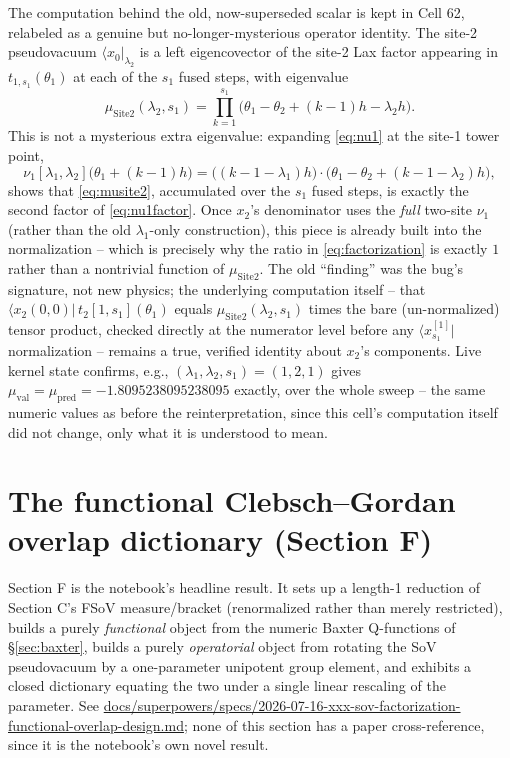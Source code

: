 \documentclass[11pt]{article}
\begin{document}
The computation behind the old, now-superseded scalar is kept in Cell 62, relabeled as a genuine
but no-longer-mysterious operator identity. The site-2 pseudovacuum $\langle x_0|_{\lambda_2}$ is a
left eigencovector of the site-2 Lax factor appearing in $t_{1,s_1}(\theta_1)$ at each of the $s_1$
fused steps, with eigenvalue
\begin{equation}
  \mu_{\mathrm{Site2}}(\lambda_2,s_1) = \prod_{k=1}^{s_1}\bigl(\theta_1-\theta_2+(k-1)h-\lambda_2 h\bigr).
  \label{eq:musite2}
\end{equation}
This is not a mysterious extra eigenvalue: expanding \eqref{eq:nu1} at the site-1 tower point,
\begin{equation}
  \nu_1[\lambda_1,\lambda_2]\bigl(\theta_1+(k-1)h\bigr) = \bigl((k-1-\lambda_1)h\bigr)\cdot
  \bigl(\theta_1-\theta_2+(k-1-\lambda_2)h\bigr),
  \label{eq:nu1factor}
\end{equation}
shows that \eqref{eq:musite2}, accumulated over the $s_1$ fused steps, is exactly the second factor
of \eqref{eq:nu1factor}. Once $x_2$'s denominator uses the \emph{full} two-site $\nu_1$ (rather than
the old $\lambda_1$-only construction), this piece is already built into the normalization -- which
is precisely why the ratio in \eqref{eq:factorization} is exactly $1$ rather than a nontrivial
function of $\mu_{\mathrm{Site2}}$. The old ``finding'' was the bug's signature, not new physics;
the underlying computation itself -- that $\langle x_2(0,0)|\,t_2[1,s_1](\theta_1)$ equals
$\mu_{\mathrm{Site2}}(\lambda_2,s_1)$ times the bare (un-normalized) tensor product, checked directly
at the numerator level before any $\langle x^{[1]}_{s_1}|$ normalization -- remains a true, verified
identity about $x_2$'s components. Live kernel state confirms, e.g.,
$(\lambda_1,\lambda_2,s_1)=(1,2,1)$ gives $\mu_{\mathrm{val}}=\mu_{\mathrm{pred}}=-1.8095238095238095$
exactly, over the whole sweep -- the same numeric values as before the reinterpretation, since this
cell's computation itself did not change, only what it is understood to mean.

\section{The functional Clebsch--Gordan overlap dictionary (Section F)}
\label{sec:dictionary}

Section F is the notebook's headline result. It sets up a length-1 reduction of Section C's FSoV
measure/bracket (renormalized rather than merely restricted), builds a purely \emph{functional}
object from the numeric Baxter Q-functions of \S\ref{sec:baxter}, builds a purely
\emph{operatorial} object from rotating the SoV pseudovacuum by a one-parameter unipotent group
element, and exhibits a closed dictionary equating the two under a single linear rescaling of the
parameter. See
\url{docs/superpowers/specs/2026-07-16-xxx-sov-factorization-functional-overlap-design.md}; none
of this section has a paper cross-reference, since it is the notebook's own novel result.
\end{document}
